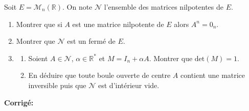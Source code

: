 \documentclass[a4paper,twoside,french,11pt]{VcCours}
\newcommand{\corr}{\textbf{Corrigé:}}
\begin{document}
\begin{Exercice}[$\bigstar$]{} Soit $E= \mathcal{M}_n(\mathbb{R})$. On note $\mathcal{N}$ l'ensemble des matrices nilpotentes de $E$.

\begin{enumerate}
\item Montrer que si $A$ est une matrice nilpotente de $E$ alors $A^n=0_n$.
\item Montrer que $\mathcal{N}$ est un fermé de $E$.
\item 
\begin{enumerate}
\item Soient $A \in \mathcal{N}$, $\alpha \in \mathbb{R}^*$ et $M=I_n+ \alpha A$. Montrer que $\textrm{det}(M)=1$.
\item En déduire que toute boule ouverte de centre $A$ contient une matrice inversible puis que $\mathcal{N}$ est d'intérieur vide.
\end{enumerate}
\end{enumerate}
\end{Exercice}

\corr 
\end{document}
